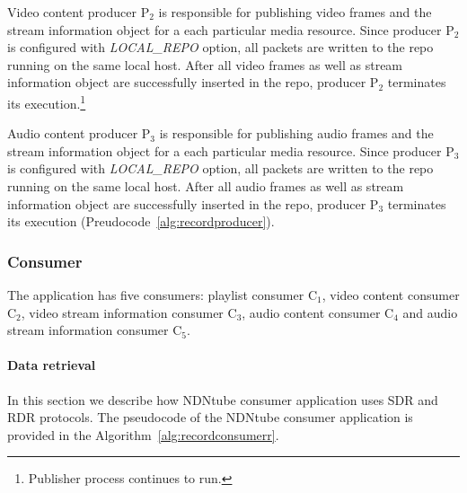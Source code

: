 Video content producer P$_{\text{2}}$ is responsible for publishing video frames and the stream information object for a each particular media resource. Since producer P$_{\text{2}}$ is configured with \textit{LOCAL\_REPO} option, all packets are written to the repo running on the same local host. After all video frames as well as stream information object are successfully inserted in the repo, producer P$_{\text{2}}$ terminates its execution.\footnote{Publisher process continues to run.} 

Audio content producer P$_{\text{3}}$ is responsible for publishing audio frames and the stream information object for a each particular media resource. Since producer P$_{\text{3}}$ is configured with \textit{LOCAL\_REPO} option, all packets are written to the repo running on the same local host. After all audio frames as well as stream information object are successfully inserted in the repo, producer P$_{\text{3}}$ terminates its execution (Preudocode~\ref{alg:recordproducer}).

\subsubsection{Consumer}

The application has five consumers: playlist consumer C$_{\text{1}}$, video content consumer C$_{\text{2}}$, video stream information consumer C$_{\text{3}}$, audio content consumer C$_{\text{4}}$ and audio stream information consumer C$_{\text{5}}$. %


\paragraph{Data retrieval} %
\label{par:ndntube_data_retrieval}
\vspace{0.3cm}

In this section we describe how NDNtube consumer application uses SDR and RDR protocols. The pseudocode of the NDNtube consumer application is provided in the Algorithm~\ref{alg:recordconsumerr}.

